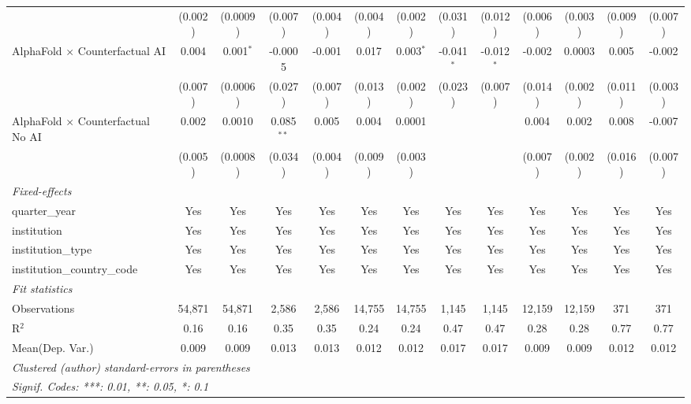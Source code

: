 \begin{tabular}{lcccccccccccc}
                                            & (0.002)       & (0.0009)     & (0.007)       & (0.004)     & (0.004)        & (0.002)      & (0.031)      & (0.012)      & (0.006) & (0.003) & (0.009) & (0.007)\\   
   AlphaFold $\times$ Counterfactual AI     & 0.004         & 0.001$^{*}$  & -0.0005       & -0.001      & 0.017          & 0.003$^{*}$  & -0.041$^{*}$ & -0.012$^{*}$ & -0.002  & 0.0003  & 0.005   & -0.002\\   
                                            & (0.007)       & (0.0006)     & (0.027)       & (0.007)     & (0.013)        & (0.002)      & (0.023)      & (0.007)      & (0.014) & (0.002) & (0.011) & (0.003)\\   
   AlphaFold $\times$ Counterfactual No AI  & 0.002         & 0.0010       & 0.085$^{**}$  & 0.005       & 0.004          & 0.0001       &              &              & 0.004   & 0.002   & 0.008   & -0.007\\   
                                            & (0.005)       & (0.0008)     & (0.034)       & (0.004)     & (0.009)        & (0.003)      &              &              & (0.007) & (0.002) & (0.016) & (0.007)\\   
   \midrule
   \emph{Fixed-effects}\\
   quarter\_year                            & Yes           & Yes          & Yes           & Yes         & Yes            & Yes          & Yes          & Yes          & Yes     & Yes     & Yes     & Yes\\  
   institution                              & Yes           & Yes          & Yes           & Yes         & Yes            & Yes          & Yes          & Yes          & Yes     & Yes     & Yes     & Yes\\  
   institution\_type                        & Yes           & Yes          & Yes           & Yes         & Yes            & Yes          & Yes          & Yes          & Yes     & Yes     & Yes     & Yes\\  
   institution\_country\_code               & Yes           & Yes          & Yes           & Yes         & Yes            & Yes          & Yes          & Yes          & Yes     & Yes     & Yes     & Yes\\  
   \midrule
   \emph{Fit statistics}\\
   Observations                             & 54,871        & 54,871       & 2,586         & 2,586       & 14,755         & 14,755       & 1,145        & 1,145        & 12,159  & 12,159  & 371     & 371\\  
   R$^2$                                    & 0.16          & 0.16         & 0.35          & 0.35        & 0.24           & 0.24         & 0.47         & 0.47         & 0.28    & 0.28    & 0.77    & 0.77\\  
Mean(Dep. Var.) & 0.009 & 0.009 & 0.013 & 0.013 & 0.012 & 0.012 & 0.017 & 0.017 & 0.009 & 0.009 & 0.012 & 0.012 \\
   \midrule \midrule
   \multicolumn{13}{l}{\emph{Clustered (author) standard-errors in parentheses}}\\
   \multicolumn{13}{l}{\emph{Signif. Codes: ***: 0.01, **: 0.05, *: 0.1}}\\
\end{tabular}
\par\endgroup
